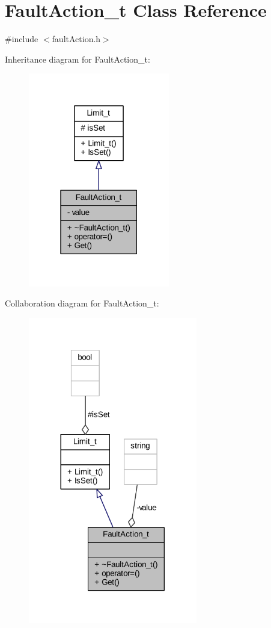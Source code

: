\hypertarget{class_fault_action__t}{}\section{Fault\+Action\+\_\+t Class Reference}
\label{class_fault_action__t}


{\ttfamily \#include $<$fault\+Action.\+h$>$}



Inheritance diagram for Fault\+Action\+\_\+t\+:
\nopagebreak
\begin{figure}[H]
\begin{center}
\leavevmode
\includegraphics[width=175pt]{class_fault_action__t__inherit__graph}
\end{center}
\end{figure}


Collaboration diagram for Fault\+Action\+\_\+t\+:
\nopagebreak
\begin{figure}[H]
\begin{center}
\leavevmode
\includegraphics[width=209pt]{class_fault_action__t__coll__graph}
\end{center}
\end{figure}
